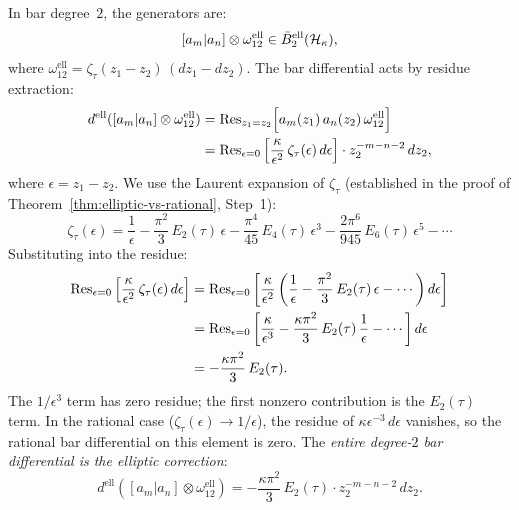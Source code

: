 \begin{computation}
\label{comp:ell-bar-deg2}
In bar degree~$2$, the generators are:
\[
[a_m | a_n] \otimes \omega_{12}^{\mathrm{ell}}
\in \bar{B}^{\mathrm{ell}}_2(\mathcal{H}_\kappa),
\]
where $\omega_{12}^{\mathrm{ell}} = \zeta_\tau(z_1 - z_2)\,(dz_1 - dz_2)$.
The bar differential acts by residue extraction:
\begin{align}\label{eq:ell-bar-diff-deg2}
d^{\mathrm{ell}}([a_m | a_n] \otimes \omega_{12}^{\mathrm{ell}})
&= \operatorname{Res}_{z_1 = z_2}\Bigl[
a_m(z_1)\,a_n(z_2)\,\omega_{12}^{\mathrm{ell}}
\Bigr] \notag \\
&= \operatorname{Res}_{\epsilon = 0}\left[
\frac{\kappa}{\epsilon^2}\,
\zeta_\tau(\epsilon)\,d\epsilon
\right] \cdot z_2^{-m-n-2}\,dz_2,
\end{align}
where $\epsilon = z_1 - z_2$.  We use the Laurent expansion of
$\zeta_\tau$ (established in the proof of
Theorem~\ref{thm:elliptic-vs-rational}, Step~1):
\begin{equation}\label{eq:zeta-laurent}
\zeta_\tau(\epsilon)
= \frac{1}{\epsilon}
- \frac{\pi^2}{3}\,E_2(\tau)\,\epsilon
- \frac{\pi^4}{45}\,E_4(\tau)\,\epsilon^3
- \frac{2\pi^6}{945}\,E_6(\tau)\,\epsilon^5
- \cdots
\end{equation}
Substituting into the residue:
\begin{align}\label{eq:ell-residue-expansion}
\operatorname{Res}_{\epsilon = 0}\left[
\frac{\kappa}{\epsilon^2}\,
\zeta_\tau(\epsilon)\,d\epsilon
\right]
&= \operatorname{Res}_{\epsilon = 0}\left[
\frac{\kappa}{\epsilon^2}\left(
\frac{1}{\epsilon}
- \frac{\pi^2}{3}\,E_2(\tau)\,\epsilon
- \cdots
\right) d\epsilon
\right] \notag \\
&= \operatorname{Res}_{\epsilon = 0}\left[
\frac{\kappa}{\epsilon^3}
- \frac{\kappa\pi^2}{3}\,E_2(\tau)\,\frac{1}{\epsilon}
- \cdots
\right] d\epsilon \notag \\
&= -\frac{\kappa\pi^2}{3}\,E_2(\tau).
\end{align}
The $1/\epsilon^3$ term has zero residue; the first nonzero
contribution is the $E_2(\tau)$ term.  In the rational case
($\zeta_\tau(\epsilon) \to 1/\epsilon$), the residue of
$\kappa\epsilon^{-3}\,d\epsilon$ vanishes, so the rational
bar differential on this element is zero.  The
\emph{entire degree-$2$ bar differential is the elliptic
correction}:
\begin{equation}\label{eq:ell-bar-diff-result}
d^{\mathrm{ell}}([a_m | a_n] \otimes \omega_{12}^{\mathrm{ell}})
= -\frac{\kappa\pi^2}{3}\,E_2(\tau)
\cdot z_2^{-m-n-2}\,dz_2.
\end{equation}
\end{computation}

